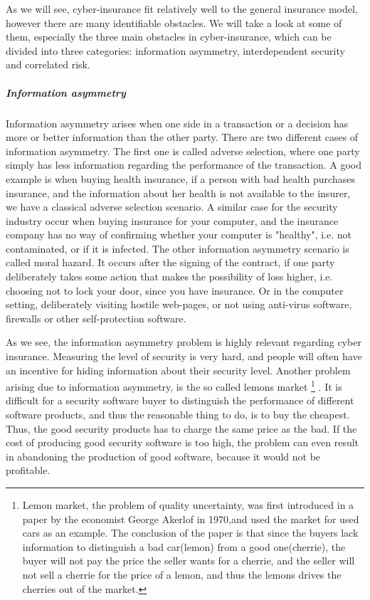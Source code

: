 As we will see, cyber-insurance fit relatively well to the general insurance model, however there are many identifiable obstacles. We will take a look at some of them, especially the three  main obstacles in cyber-insurance, which can be divided into three categories: information asymmetry, interdependent security and  correlated risk. 
\subparagraph{Information asymmetry}
Information asymmetry arises when one side in a transaction or a decision has more or better information than the other party. There are two different cases of information asymmetry. The first one is called adverse selection, where one party simply has less information regarding the performance of the transaction. A good example is when buying health insurance, if a person with bad health purchases insurance, and the information about her health is not available to the insurer, we have a classical adverse selection scenario. A similar case for the security industry occur when buying insurance for your computer, and the insurance company has no way of confirming whether your computer is "healthy", i.e. not contaminated, or if it is infected. 
The other information asymmetry scenario is called moral hazard. It occurs after the signing of the contract, if one party deliberately takes some action that makes the possibility of loss higher, i.e. choosing not to lock your door, since you have insurance. Or in the computer setting, deliberately visiting hostile web-pages, or not using anti-virus software, firewalls or other self-protection software.
    \cite{solutiontoinfoasym}
    
As we see, the information asymmetry problem is highly relevant regarding cyber insurance. Measuring the level of security is very hard, and people will often have an incentive for hiding information about their security level. Another problem arising due to information asymmetry, is the so called lemons market 
\footnote{Lemon market, the problem of quality uncertainty, was first introduced in a paper \cite{lemonpaper} by the economist George Akerlof in 1970,and used the market for used cars as an example.\cite{lemon} The conclusion of the paper is that since the buyers lack information to distinguish a bad car(lemon) from a good one(cherrie), the buyer will not pay the price the seller wants for a cherrie, and the seller will not sell a cherrie for the price of a lemon, and thus the lemons drives the cherries out of the market.}
. 
It is difficult for a security software buyer to distinguish the performance of different software products, and thus the reasonable thing to do, is to buy the cheapest. Thus, the good security products has to charge the same price as the bad. If the cost of producing good security software is too high, the problem can even result in abandoning the production of good software, because it would not be profitable.

